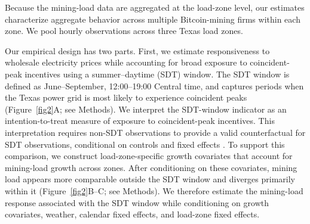 \documentclass[pdflatex,sn-mathphys-num]{sn-jnl}%
\theoremstyle{thmstyleone}%
\theoremstyle{thmstyletwo}%
\theoremstyle{thmstylethree}%
\begin{document}
Because the mining-load data are aggregated at the load-zone level, our estimates characterize aggregate behavior across multiple Bitcoin-mining firms within each zone. We pool hourly observations across three Texas load zones.

Our empirical design has two parts. First, we estimate responsiveness to wholesale electricity prices while accounting for broad exposure to coincident-peak incentives using a summer--daytime (SDT) window. The SDT window is defined as June--September, 12{:}00--19{:}00 Central time, and captures periods when the Texas power grid is most likely to experience coincident peaks (Figure~\ref{fig2}A; see Methods). We interpret the SDT-window indicator as an intention-to-treat measure of exposure to coincident-peak incentives. This interpretation requires non-SDT observations to provide a valid counterfactual for SDT observations, conditional on controls and fixed effects \cite{roth2023s, angrist2009mostly}. To support this comparison, we construct load-zone-specific growth covariates that account for mining-load growth across zones. After conditioning on these covariates, mining load appears more comparable outside the SDT window and diverges primarily within it (Figure~\ref{fig2}B--C; see Methods). We therefore estimate the mining-load response associated with the SDT window while conditioning on growth covariates, weather, calendar fixed effects, and load-zone fixed effects.
\end{document}
